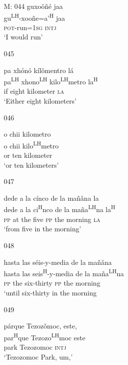 \begin{itemize}
\item[M: 044]
\glll   guxo\v{o}\~{n}\'{e} jaa \\
gu\textsuperscript{LH}-xoo\~{n}e=a'\textsuperscript{H} jaa \\
\textsc{pot}-run=\textsc{1sg} \textsc{intj} \\
\glt `I would run'
 

\item[045]
 
\glll  pa xh\'{o}n\'{o} k\'{i}l\v{o}mentro l\'{a} \\
pa\textsuperscript{LH} xhono\textsuperscript{LH} kilo\textsuperscript{LH}metro la\textsuperscript{H} \\
if eight kilometer \textsc{la} \\
\glt `Either eight kilometers'
 

\item[046]
 
\glll   o chii kilometro \\
o chii kilo\textsuperscript{LH}metro \\
or ten kilometer \\
\glt `or ten kilometers'
 

\item[047]
 
\glll   dede a la c\'{i}nco de la ma\~{n}\v{an}a la \\
dede a la ci\textsuperscript{H}nco de la ma\~{n}a\textsuperscript{LH}na la\textsuperscript{H} \\
\textsc{pp} at the five \textsc{pp} the morning \textsc{la} \\
\glt `from five in the morning'
 

\item[048]
 
\glll  hasta las s\'{e}is-y-media de la ma\~{n}\v{a}na \\
hasta las seis\textsuperscript{H}-y-media de la ma\~{n}a\textsuperscript{LH}na \\
\textsc{pp} the six-thirty \textsc{pp} the morning \\
\glt `until six-thirty in the morning
 


\item[049]
 
\glll   p\'{a}rque Tezoz\v{o}moc, este, \\
par\textsuperscript{H}que Tezozo\textsuperscript{LH}moc este \\
park Tezozomoc \textsc{intj} \\
\glt `Tezozomoc Park, um,' 
 



\end{itemize}
